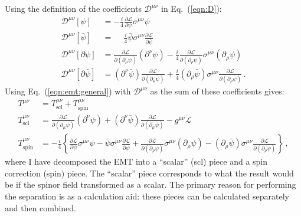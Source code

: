 \documentclass[prd,preprint,
  showpacs,showkeys,lengthcheck,
  nofootinbib,tightenlines,onecolumn,notitlepage,
  preprintnumbers,superscriptaddress]{revtex4-1}
\newcommand{\Lag}{\ensuremath{\mathscr{L}}}
\begin{document}
Using the definition of the coefficients $\mathscr{D}^{\mu\nu}$
in Eq.~(\ref{eqn:D}):
\begin{subequations}
  \label{eqn:D:spinor}
  \begin{align}
    \mathscr{D}^{\mu\nu}[\psi]
    &=
    - \frac{i}{4}
    \frac{\partial\Lag}{\partial\psi}
    \sigma^{\mu\nu}
    \psi
    \\
    \mathscr{D}^{\mu\nu}[\bar\psi]
    &=
    \phantom{-} \frac{i}{4}
    \bar\psi
    \sigma^{\mu\nu}
    \frac{\partial\Lag}{\partial\bar\psi}
    \\
    \mathscr{D}^{\mu\nu}[\partial\psi]
    &=
    \frac{\partial\Lag}{\partial(\partial_\mu\psi)}
    (\partial^\nu \psi)
    -
    \frac{i}{4}
    \frac{\partial\Lag}{\partial(\partial_\rho\psi)}
    \sigma^{\mu\nu}
    (\partial_\rho \psi)
    \\
    \mathscr{D}^{\mu\nu}[\partial\bar\psi]
    &=
    (\partial^\nu \bar\psi)
    \frac{\partial\Lag}{\partial(\partial_\mu\bar\psi)}
    +
    \frac{i}{4}
    (\partial_\rho \bar\psi)
    \sigma^{\mu\nu}
    \frac{\partial\Lag}{\partial(\partial_\rho\bar\psi)}
    \,.
  \end{align}
\end{subequations}
Using Eq.~(\ref{eqn:emt:general}) with $\mathscr{D}^{\mu\nu}$
as the sum of these coefficients gives:
\begin{subequations}
  \label{eqn:emt:spinor}
  \begin{align}
    T^{\mu\nu}
    &=
    T^{\mu\nu}_{\mathrm{scl}}
    +
    T^{\mu\nu}_{\mathrm{spin}}
    \\
    T^{\mu\nu}_{\mathrm{scl}}
    &=
    \frac{\partial \Lag}{\partial(\partial_\mu\psi)}
    (\partial^\nu \psi)
    +
    (\partial^\nu \bar\psi)
    \frac{\partial \Lag}{\partial(\partial_\mu\bar\psi)}
    -
    g^{\mu\nu} \Lag
    \\
    T^{\mu\nu}_{\mathrm{spin}}
    &=
    -
    \frac{i}{4}
    \left\{
      \frac{\partial \Lag}{\partial \psi}
      \sigma^{\mu\nu}
      \psi
      -
      \bar\psi
      \sigma^{\mu\nu}
      \frac{\partial \Lag}{\partial \bar\psi}
      +
      \frac{\partial \Lag}{\partial(\partial_\rho\psi)}
      \sigma^{\mu\nu}
      (\partial_\rho\psi)
      -
      (\partial_\rho\bar\psi)
      \sigma^{\mu\nu}
      \frac{\partial \Lag}{\partial(\partial_\rho\bar\psi)}
      \right\}
    \,,
  \end{align}
\end{subequations}
where I have decomposed the EMT into a ``scalar'' (scl) piece
and a spin correction (spin) piece.
The ``scalar'' piece corresponds to what the result would be if the spinor field
transformed as a scalar.
The primary reason for performing the separation is as a calculation aid:
these pieces can be calculated separately and then combined.
\end{document}
